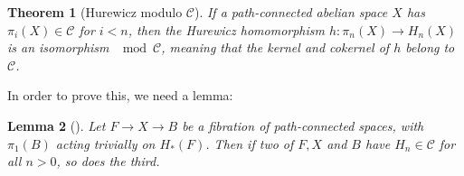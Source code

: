 \documentclass[reqno]{amsart}
\newtheorem{theorem}{Theorem}[section]
\newtheorem{lemma}[theorem]{Lemma}
\theoremstyle{definition}
\theoremstyle{remark}
\begin{document}
\begin{theorem}[Hurewicz modulo $\mathcal{C}$]\label{Thm:Hurewicz-Mod-C}
    If a path-connected abelian space
    $X$ has $\pi_i (X) \in \mathcal{C}$ for $i < n$, then
    the Hurewicz homomorphism $h \colon
    \pi_n (X) \to H_n(X)$ is an isomorphism
    $\mod \mathcal{C}$, meaning
    that the kernel and cokernel of $h$ belong
    to $\mathcal{C}$.
\end{theorem}

In order to prove this, we need a lemma:

\begin{lemma}[]\label{Lemma:SIDOA1}
    Let $F \to X\to B$ be a fibration of path-connected
    spaces, with $\pi_1 (B)$ acting trivially
    on $H_*(F)$. Then if two of $F,X$ and $B$ have
    $H_n \in \mathcal{C}$ for all $n>0$, so does
    the third.
\end{lemma}
\end{document}
